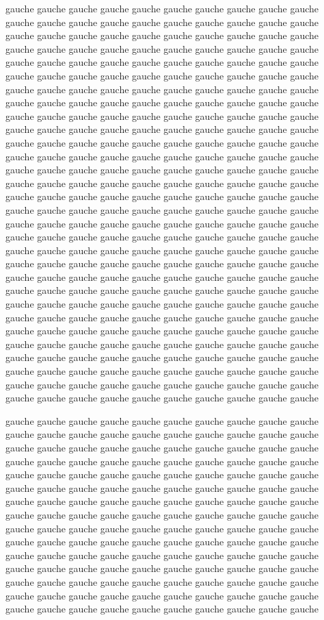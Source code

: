 \documentclass[openany]{book}
\begin{document}
\begin{pages}
\begin{Leftside}
\pstart
%
gauche gauche gauche gauche gauche gauche gauche gauche gauche gauche
gauche gauche gauche gauche gauche gauche gauche gauche gauche gauche
gauche gauche gauche gauche gauche gauche gauche gauche gauche gauche
gauche gauche gauche gauche gauche gauche gauche gauche gauche gauche
gauche gauche gauche gauche gauche gauche gauche gauche gauche gauche
gauche gauche gauche gauche gauche gauche gauche gauche gauche gauche
gauche gauche gauche gauche gauche gauche gauche gauche gauche gauche
gauche gauche gauche gauche gauche gauche gauche gauche gauche gauche
gauche gauche gauche gauche gauche gauche gauche gauche gauche gauche
gauche gauche gauche gauche gauche gauche gauche gauche gauche gauche
gauche gauche gauche gauche gauche gauche gauche gauche gauche gauche
gauche gauche gauche gauche gauche gauche gauche gauche gauche gauche
gauche gauche gauche gauche gauche gauche gauche gauche gauche gauche
gauche gauche gauche gauche gauche gauche gauche gauche gauche gauche
gauche gauche gauche gauche gauche gauche gauche gauche gauche gauche
gauche gauche gauche gauche gauche gauche gauche gauche gauche gauche
gauche gauche gauche gauche gauche gauche gauche gauche gauche gauche
gauche gauche gauche gauche gauche gauche gauche gauche gauche gauche
gauche gauche gauche gauche gauche gauche gauche gauche gauche gauche
gauche gauche gauche gauche gauche gauche gauche gauche gauche gauche
gauche gauche gauche gauche gauche gauche gauche gauche gauche gauche
gauche gauche gauche gauche gauche gauche gauche gauche gauche gauche
gauche gauche gauche gauche gauche gauche gauche gauche gauche gauche
gauche gauche gauche gauche gauche gauche gauche gauche gauche gauche
gauche gauche gauche gauche gauche gauche gauche gauche gauche gauche
gauche gauche gauche gauche gauche gauche gauche gauche gauche gauche
gauche gauche gauche gauche gauche gauche gauche gauche gauche gauche
gauche gauche gauche gauche gauche gauche gauche gauche gauche gauche
gauche gauche gauche gauche gauche gauche gauche gauche gauche gauche
gauche gauche gauche gauche gauche gauche gauche gauche gauche gauche
%
\pend

\pstart
%
gauche gauche gauche gauche gauche gauche gauche gauche gauche gauche
gauche gauche gauche gauche gauche gauche gauche gauche gauche gauche
gauche gauche gauche gauche gauche gauche gauche gauche gauche gauche
gauche gauche gauche gauche gauche gauche gauche gauche gauche gauche
gauche gauche gauche gauche gauche gauche gauche gauche gauche gauche
gauche gauche gauche gauche gauche gauche gauche gauche gauche gauche
gauche gauche gauche gauche gauche gauche gauche gauche gauche gauche
gauche gauche gauche gauche gauche gauche gauche gauche gauche gauche
gauche gauche gauche gauche gauche gauche gauche gauche gauche gauche
gauche gauche gauche gauche gauche gauche gauche gauche gauche gauche
gauche gauche gauche gauche gauche gauche gauche gauche gauche gauche
gauche gauche gauche gauche gauche gauche gauche gauche gauche gauche
gauche gauche gauche gauche gauche gauche gauche gauche gauche gauche
gauche gauche gauche gauche gauche gauche gauche gauche gauche gauche
gauche gauche gauche gauche gauche gauche gauche gauche gauche gauche
%
\pend


\end{Leftside}
\end{pages}
\end{document}
